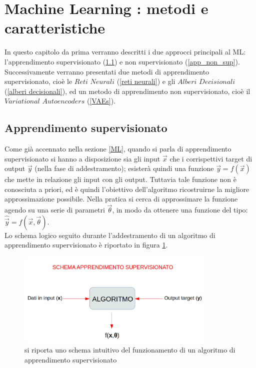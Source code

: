\section{Machine Learning : metodi e caratteristiche}
\label{ML: metodi e caratteristiche}

In questo capitolo da prima verranno descritti i due approcci principali al ML: l'apprendimento supervisionato (\ref{app_sup}) e non supervisionato (\ref{app_non_sup}). Successivamente verranno presentati due metodi di apprendimento supervisionato, cioè le $\textit{Reti Neurali}$ (\ref{reti neurali}) e gli $\textit{Alberi Decisionali}$ (\ref{alberi decisionali}), ed un metodo di apprendimento non supervisionato, cioè il $\textit{Variational Autoencoders}$ (\ref{VAEs}).


\subsection{Apprendimento supervisionato}
\label{app_sup}
Come già accennato nella sezione \ref{ML}, quando si parla di apprendimento supervisionato si hanno a disposizione sia gli input $\vec{x}$ che i corrispettivi target di output $\vec{y}$ (nella fase di addestramento); esisterà quindi una funzione 
$\vec{y} = f(\vec{x})$ che mette in relazione gli input con gli output. Tuttavia tale funzione non è conosciuta a priori, ed è quindi l'obiettivo dell'algoritmo ricostruirne la migliore approssimazione possibile.
Nella pratica si cerca di approssimare la funzione agendo su una serie di parametri $\vec{\theta}$, in modo da ottenere una funzione del tipo: $\hat{\vec{y}} = f(\vec{x},\vec{\theta})$. \\
Lo schema logico seguito durante l'addestramento di un algoritmo di apprendimento supervisionato è riportato in figura \ref{fig:schema_app_sup}.

\begin{figure}[h!]
	\centering
	\includegraphics[width=0.85\textwidth]{figs/App_sup.png}
	\caption{si riporta uno schema intuitivo del funzionamento di un algoritmo di apprendimento supervisionato}
	\label{fig:schema_app_sup}
\end{figure}


